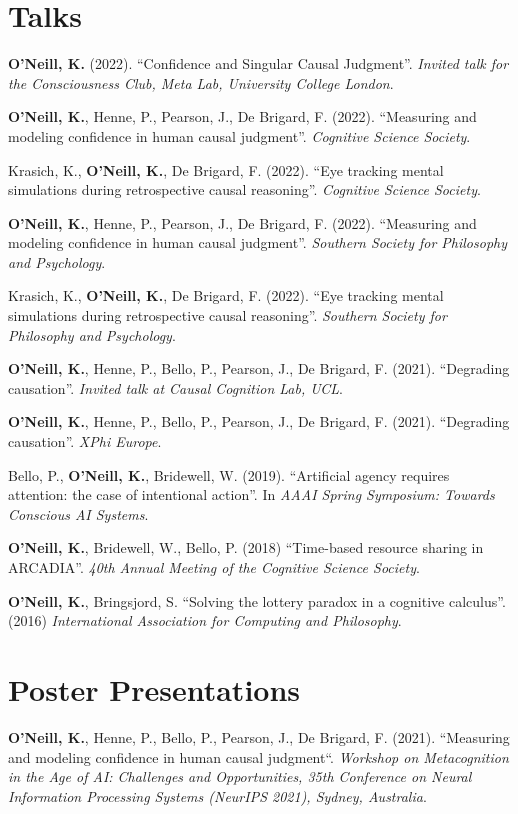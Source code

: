 \section{Talks}
\textbf{O'Neill, K.} (2022). ``Confidence and Singular Causal
Judgment''. \emph{Invited talk for the Consciousness Club, Meta Lab,
University College London}.

\textbf{O'Neill, K.}, Henne, P., Pearson, J., De Brigard,
F. (2022). ``Measuring and modeling confidence in human causal
judgment''. \emph{Cognitive Science Society}.

Krasich, K., \textbf{O'Neill, K.}, De Brigard, F. (2022). ``Eye
tracking mental simulations during retrospective causal
reasoning''. \emph{Cognitive Science Society}.

\textbf{O'Neill, K.}, Henne, P., Pearson, J., De Brigard,
F. (2022). ``Measuring and modeling confidence in human causal
judgment''. \emph{Southern Society for Philosophy and Psychology}.

Krasich, K., \textbf{O'Neill, K.}, De Brigard, F. (2022). ``Eye
tracking mental simulations during retrospective causal
reasoning''. \emph{Southern Society for Philosophy and Psychology}.

\textbf{O'Neill, K.}, Henne, P., Bello, P., Pearson, J., De Brigard,
F. (2021). ``Degrading causation''. \emph{Invited talk at Causal
Cognition Lab, UCL}.

\textbf{O'Neill, K.}, Henne, P., Bello, P., Pearson, J., De Brigard,
F. (2021). ``Degrading causation''. \emph{XPhi Europe}.

Bello, P., \textbf{O'Neill, K.}, Bridewell, W. (2019). ``Artificial
agency requires attention: the case of intentional action''. In
\emph{AAAI Spring Symposium: Towards Conscious AI Systems}.

\textbf{O'Neill, K.}, Bridewell, W., Bello, P. (2018) ``Time-based
resource sharing in ARCADIA''. \emph{40th Annual Meeting of the
Cognitive Science Society}.

\textbf{O’Neill, K.}, Bringsjord, S. ``Solving the lottery paradox in
a cognitive calculus''. (2016) \emph{International Association for
Computing and Philosophy}.

\line\section{Poster Presentations}
\textbf{O'Neill, K.}, Henne, P., Bello, P., Pearson, J., De Brigard,
F. (2021). ``Measuring and modeling confidence in human causal
judgment``. \emph{Workshop on Metacognition in the Age of AI:
Challenges and Opportunities, 35th Conference on Neural Information
Processing Systems (NeurIPS 2021), Sydney, Australia}.

